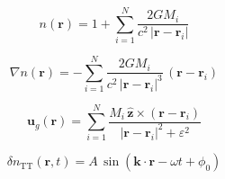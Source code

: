 \documentclass{article}
\begin{document}
\[
 n(\mathbf{r}) = 1 + \sum_{i=1}^N \dfrac{2 G M_i}{c^2 \, |\mathbf{r} - \mathbf{r}_i|}
\]

\[
 \nabla n(\mathbf{r}) = - \sum_{i=1}^N \dfrac{2 G M_i}{c^2 \, |\mathbf{r} - \mathbf{r}_i|^3} \, (\mathbf{r} - \mathbf{r}_i)
\]

\[
 \mathbf{u}_g(\mathbf{r}) = \sum_{i=1}^N \dfrac{M_i \, \hat{\mathbf{z}} \times (\mathbf{r} - \mathbf{r}_i)}{|\mathbf{r} - \mathbf{r}_i|^2 + \varepsilon^2}
\]

\[
 \delta n_{\mathrm{TT}}(\mathbf{r}, t) = A \, \sin(\mathbf{k} \cdot \mathbf{r} - \omega t + \phi_0)
\]
\end{document}
